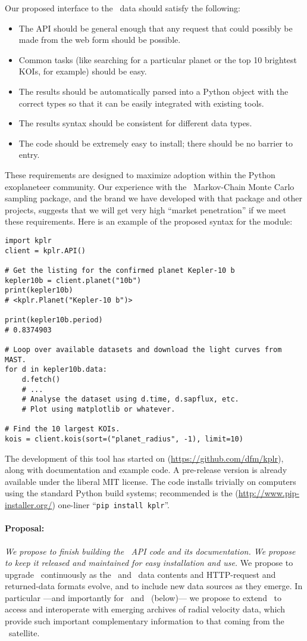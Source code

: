 \documentclass[letterpaper,12pt,preprint]{hack_aastex}
\newcommand{\hurl}[1]{{\scriptsize\url{#1}}}
\newcommand{\kplr}{\package{kplr}}
\newcommand{\Bart}{\package{Bart}}
\newcommand{\emcee}{\package{emcee}}
\newcommand{\TheCreator}{\package{TheCreator}}
\begin{document}
Our proposed interface to the \Kepler\ data should satisfy the following:
\begin{itemize}
\item The API should be general enough that any request that could
possibly be made from the web form should be possible.
\item Common tasks (like searching for a particular planet or the top 10
brightest KOIs, for example) should be easy.
\item The results should be automatically parsed into a Python object with the
correct types so that it can be easily integrated with existing tools.
\item The results syntax should be consistent for different data types.
\item The code should be extremely easy to install; there should be no
barrier to entry.
\end{itemize}
These requirements are designed to maximize adoption within the Python
exoplaneteer community.
Our experience with the \emcee\ Markov-Chain Monte Carlo sampling package,
and the brand we have developed with that package and other projects,
suggests that we will get very high ``market penetration'' if we meet these
requirements.  Here is an example of the proposed syntax for the module:
\begin{lstlisting}
import kplr
client = kplr.API()

# Get the listing for the confirmed planet Kepler-10 b
kepler10b = client.planet("10b")
print(kepler10b)
# <kplr.Planet("Kepler-10 b")>

print(kepler10b.period)
# 0.8374903

# Loop over available datasets and download the light curves from MAST.
for d in kepler10b.data:
    d.fetch()
    # ...
    # Analyse the dataset using d.time, d.sapflux, etc.
    # Plot using matplotlib or whatever.

# Find the 10 largest KOIs.
kois = client.kois(sort=("planet_radius", -1), limit=10)
\end{lstlisting}
The development of this tool has started on 
(\hurl{https://github.com/dfm/kplr}),
along with documentation and example code.
A pre-release version is already available under the liberal MIT
license.
The code installs trivially on computers using the standard Python build
systems; recommended is the  
(\hurl{http://www.pip-installer.org/}) one-liner ``\texttt{pip install kplr}''.

\paragraph{Proposal:}
\emph{We propose to finish building the \kplr\ API code and its documentation.
We propose to keep it released and maintained for easy installation and use.}
We propose to upgrade \kplr\ continuously as the \MAST\ and \EA\ data contents and
HTTP-request and returned-data formats evolve,
and to include new data sources as they emerge.
In particular%
---and importantly for \Bart\ and \TheCreator\ (below)---%
we propose to extend \kplr\ to access and interoperate with
emerging archives of radial velocity data,
which provide such important complementary information to that coming from
the \Kepler\ satellite.
\end{document}
